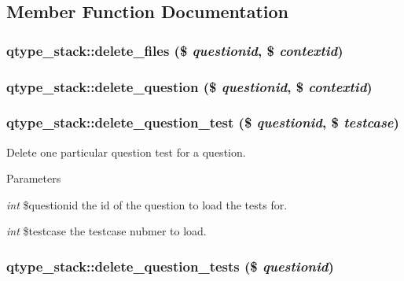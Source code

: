 \subsection{Member Function Documentation}
\hypertarget{classqtype__stack_aab3047dc06ec4383ae570894cf1fe349}{
\subsubsection[{delete\_\-files}]{\setlength{\rightskip}{0pt plus 5cm}qtype\_\-stack::delete\_\-files (\$ {\em questionid}, \/  \$ {\em contextid})}}
\label{classqtype__stack_aab3047dc06ec4383ae570894cf1fe349}
\hypertarget{classqtype__stack_a570cbcb256ddee98da84b592d0fb6b59}{
\subsubsection[{delete\_\-question}]{\setlength{\rightskip}{0pt plus 5cm}qtype\_\-stack::delete\_\-question (\$ {\em questionid}, \/  \$ {\em contextid})}}
\label{classqtype__stack_a570cbcb256ddee98da84b592d0fb6b59}
\hypertarget{classqtype__stack_a35926382f4b8e63b40132ac5fea4d33b}{
\subsubsection[{delete\_\-question\_\-test}]{\setlength{\rightskip}{0pt plus 5cm}qtype\_\-stack::delete\_\-question\_\-test (\$ {\em questionid}, \/  \$ {\em testcase})}}
\label{classqtype__stack_a35926382f4b8e63b40132ac5fea4d33b}
Delete one particular question test for a question. 
\begin{DoxyParams}{Parameters}
\item[{\em int}]\$questionid the id of the question to load the tests for. \item[{\em int}]\$testcase the testcase nubmer to load. \end{DoxyParams}
\hypertarget{classqtype__stack_aa04a9197ef37eff57dca6ca2a04f5d83}{
\subsubsection[{delete\_\-question\_\-tests}]{\setlength{\rightskip}{0pt plus 5cm}qtype\_\-stack::delete\_\-question\_\-tests (\$ {\em questionid})}}
